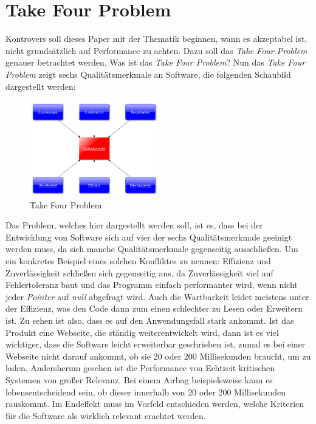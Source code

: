 \section{Take Four Problem}
Kontrovers soll dieses Paper mit der Thematik beginnen, wann es akzeptabel ist, nicht
grundsätzlich auf Performance zu achten. Dazu soll das \emph{Take Four Problem} genauer
betrachtet werden. Was ist das \emph{Take Four Problem}? Nun das \emph{Take Four Problem} zeigt
sechs Qualitätsmerkmale an Software, die folgenden Schaubild dargestellt werden:

\begin{figure}[h]
    \centering
    \includegraphics[width=0.5\textwidth]{bilder/ISO2}
    \caption[T4P]{Take Four Problem}
    \label{img:T4P}
\end{figure}

Das Problem, welches hier dargestellt werden soll, ist es, dass bei der Entwicklung von Software
sich auf vier der sechs Qualitätsmerkmale geeinigt werden muss, da sich manche Qualitätsmerkmale
gegenseitig ausschließen. Um ein konkretes Beispiel eines solchen Konfliktes zu nennen: Effizienz
und Zuverlässigkeit schließen sich gegenseitig aus, da Zuverlässigkeit viel auf Fehlertoleranz
baut und das Programm einfach performanter wird, wenn nicht jeder \emph{Pointer} auf \emph{null}
abgefragt wird. Auch die Wartbarkeit leidet meistens unter der Effizienz, was den Code dann zum
einen schlechter zu Lesen oder Erweitern ist.
\newline
\newline
Zu sehen ist also, dass es auf den Anwendungsfall stark ankommt. Ist das Produkt eine Webseite,
die ständig weiterentwickelt wird, dann ist es viel wichtiger, dass die Software leicht
erweiterbar geschrieben ist, zumal es bei einer Webseite nicht darauf ankommt, ob sie 20 oder 200
Millisekunden braucht, um zu laden.
\newline
\newline
Andersherum gesehen ist die Performance von Echtzeit kritischen Systemen von großer Relevanz. Bei
einem Airbag beispielsweise kann es lebensentscheidend sein, ob dieser innerhalb von 20 oder 200
Millisekunden rauskommt. Im Endeffekt muss im Vorfeld entschieden werden, welche Kriterien für
die Software als wirklich relevant erachtet werden.